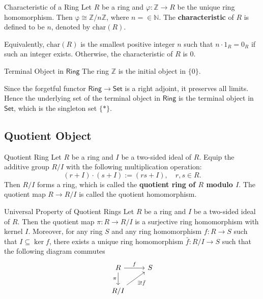 \begin{definition}{Characteristic of a Ring}{}
    Let $R$ be a ring and $\varphi:\mathbb{Z}\to R$ be the unique ring homomorphism. Then $\mathrm{\varphi}\cong \mathbb{Z}/n\mathbb{Z}$, where $n=\in\mathbb{N}$.
    The \textbf{characteristic} of $R$ is defined to be $n$, denoted by $\mathrm{char}(R)$.

    Equivalently, $\mathrm{char}(R)$ is the smallest positive integer $n$ such that $n\cdot 1_R=0_R$ if such an integer exists. Otherwise, the characteristic of $R$ is $0$.
\end{definition}

\begin{proposition}{Terminal Object in $\mathsf{Ring}$}{}
    The ring $\mathbb{Z}$ is the initial object in $\{0\}$.
\end{proposition}

Since the forgetful functor $\mathsf{Ring}\to\mathsf{Set}$ is a right adjoint, it preserves all limits. Hence the underlying set of the terminal object in $\mathsf{Ring}$ is the terminal object in $\mathsf{Set}$, which is the singleton set $\{*\}$.



\subsection{Quotient Object}
\begin{definition}{Quotient Ring}{}
    Let $R$ be a ring and $I$ be a two-sided ideal of $R$. Equip the additive group \( R / I \) with the following multiplication operation:
\[
(r+I) \cdot (s+I) := (rs + I), \quad r, s \in R .
\]
Then \( R / I \) forms a ring, which is called the \textbf{quotient ring of \( R \) modulo \( I \)}. The quotient map \( R \rightarrow R / I \) is called the quotient homomorphism.
\end{definition}

\begin{proposition}{Universal Property of Quotient Rings}{}
    Let $R$ be a ring and $I$ be a two-sided ideal of $R$. Then the quotient map $\pi:R\to R/I$ is a surjective ring homomorphism with kernel $I$. Moreover, for any ring $S$ and any ring homomorphism $f:R\to S$ such that $I\subseteq\ker f$, there exists a unique ring homomorphism $\bar{f}:R/I\to S$ such that the following diagram commutes
    \[
    \begin{tikzcd}[ampersand replacement=\&]
        R \arrow[r, "f"] \arrow[d, "\pi"'] \& S \\
        R/I \arrow[ru, "\exists!\bar{f}"'] \&  
    \end{tikzcd}
    \] 
\end{proposition}

